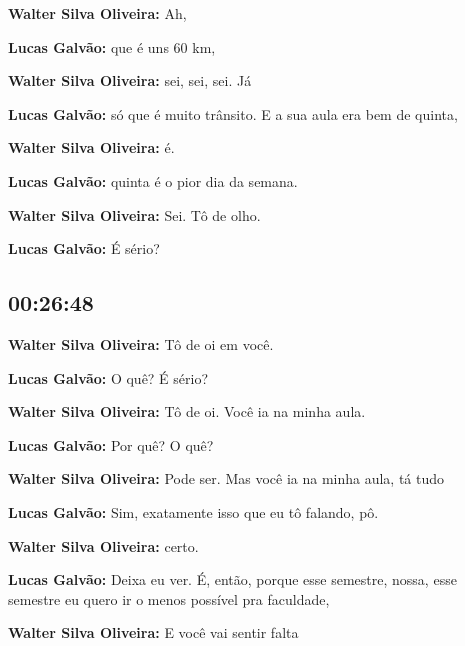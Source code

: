 \textbf{Walter Silva Oliveira:} Ah,



\textbf{Lucas Galvão:} que é uns 60 km,



\textbf{Walter Silva Oliveira:} sei, sei, sei. Já



\textbf{Lucas Galvão:} só que é muito trânsito. E a sua aula era bem de quinta,



\textbf{Walter Silva Oliveira:} é.



\textbf{Lucas Galvão:} quinta é o pior dia da semana.



\textbf{Walter Silva Oliveira:} Sei. Tô de olho.



\textbf{Lucas Galvão:} É sério?



\subsection{\textbf{00:26:48}}



\textbf{Walter Silva Oliveira:} Tô de oi em você.



\textbf{Lucas Galvão:} O quê? É sério?



\textbf{Walter Silva Oliveira:} Tô de oi. Você ia na minha aula.



\textbf{Lucas Galvão:} Por quê? O quê?



\textbf{Walter Silva Oliveira:} Pode ser. Mas você ia na minha aula, tá tudo



\textbf{Lucas Galvão:} Sim, exatamente isso que eu tô falando, pô.



\textbf{Walter Silva Oliveira:} certo.



\textbf{Lucas Galvão:} Deixa eu ver. É, então, porque esse semestre, nossa, esse semestre eu quero ir o menos possível pra faculdade,



\textbf{Walter Silva Oliveira:} E você vai sentir falta



